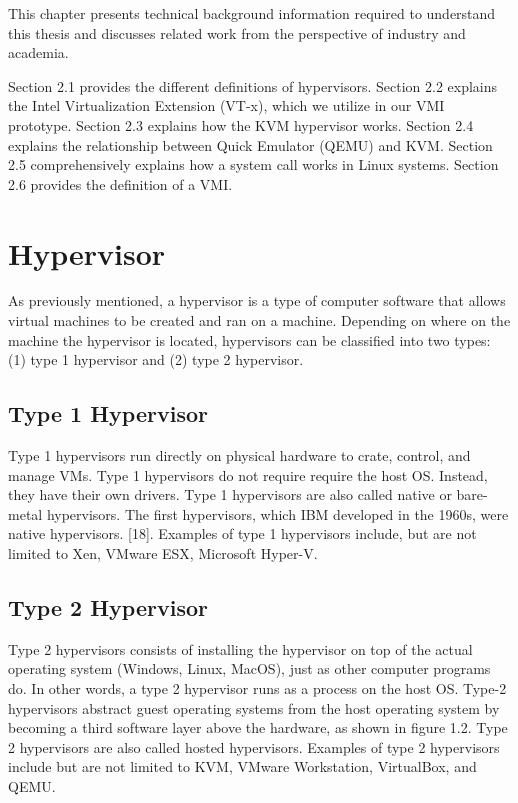 \documentclass{report}
\begin{document}
\begin{spacing}{1.5}
{\large
This chapter presents technical background information required to understand this
thesis and discusses related work from the perspective of industry and academia. 
\newline
}

{\large
Section 2.1 provides the different definitions of hypervisors. 
Section 2.2 explains the Intel Virtualization Extension (VT-x), which we utilize in our VMI prototype. 
Section 2.3 explains how the KVM hypervisor works. 
Section 2.4 explains the relationship between Quick Emulator (QEMU) and KVM. 
Section 2.5 comprehensively explains how a system call works in Linux systems. 
Section 2.6 provides the definition of a VMI. 
\newline
}









\section{Hypervisor}

{\large
As previously mentioned, a hypervisor is a type of computer software that allows virtual machines to be created and ran on a machine. Depending on where on the machine the hypervisor is located, hypervisors can be classified into two types: (1) type 1 hypervisor and (2) type 2 hypervisor.
\newline
}

\subsection{Type 1 Hypervisor}

{\large
Type 1 hypervisors run directly on physical hardware to crate, control, and manage VMs. Type 1 hypervisors do not require  require the host OS. Instead, they have their own drivers. Type 1 hypervisors are also called native or bare-metal hypervisors. The first hypervisors, which IBM developed in the 1960s, were native hypervisors. [18]. Examples of type 1 hypervisors include, but are not limited to Xen, VMware ESX, Microsoft Hyper-V.
\newline
}


\subsection{Type 2 Hypervisor}

{\large
Type 2 hypervisors consists of installing the hypervisor on top of the actual operating system (Windows, Linux, MacOS), just as other computer programs do. In other words, a type 2 hypervisor runs as a process on the host OS. Type-2 hypervisors abstract guest operating systems from the host operating system by becoming a third software layer above the hardware, as shown in figure 1.2. Type 2 hypervisors are also called hosted hypervisors. Examples of type 2 hypervisors include but are not limited to KVM, VMware Workstation, VirtualBox, and QEMU.
\newline
}


\end{spacing}
\end{document}
